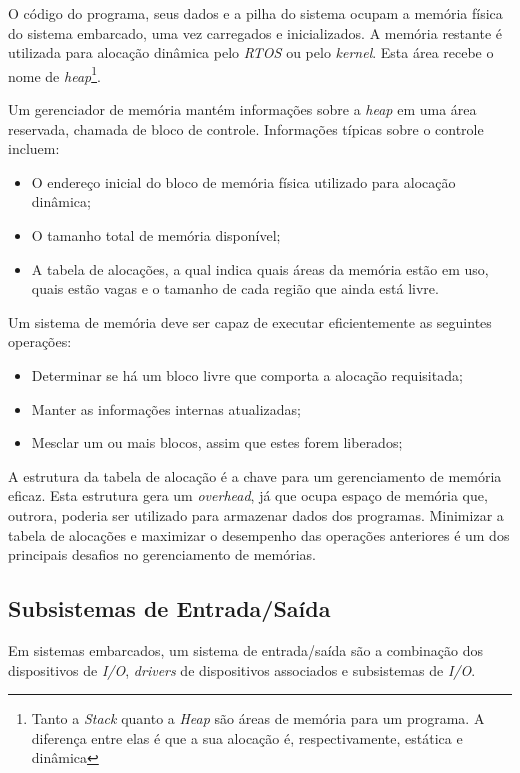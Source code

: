 O código do programa, seus dados e a pilha do sistema ocupam a memória física do sistema embarcado, uma vez carregados e inicializados. A memória restante é utilizada para alocação dinâmica pelo \emph{RTOS} ou pelo \emph{kernel}. Esta área recebe o nome de \emph{heap}\footnote{Tanto a \emph{Stack} quanto a \emph{Heap} são áreas de memória para um programa. A diferença entre elas é que a sua alocação é, respectivamente, estática e dinâmica}.

Um gerenciador de memória mantém informações sobre a \emph{heap} em uma área reservada, chamada de bloco de controle. Informações típicas sobre o controle incluem:

\begin{itemize}
	\item O endereço inicial do bloco de memória física utilizado para alocação dinâmica;
	\item O tamanho total de memória disponível;
	\item A tabela de alocações, a qual indica quais áreas da memória estão em uso, quais estão vagas e o tamanho de cada região que ainda está livre.
\end{itemize}

Um sistema de memória deve ser capaz de executar eficientemente as seguintes operações:

\begin{itemize}
	\item Determinar se há um bloco livre que comporta a alocação requisitada;
	\item Manter as informações internas atualizadas;
	\item Mesclar um ou mais blocos, assim que estes forem liberados;
\end{itemize}

A estrutura da tabela de alocação é a chave para um gerenciamento de memória eficaz. Esta estrutura gera um \emph{overhead}, já que ocupa espaço de memória que, outrora, poderia ser utilizado para armazenar dados dos programas. Minimizar a tabela de alocações e maximizar o desempenho das operações anteriores é um dos principais desafios no gerenciamento de memórias.

\subsection{Subsistemas de Entrada/Saída}

Em sistemas embarcados, um sistema de entrada/saída são a combinação dos dispositivos de \emph{I/O}, \emph{drivers} de dispositivos associados e subsistemas de \emph{I/O}.

